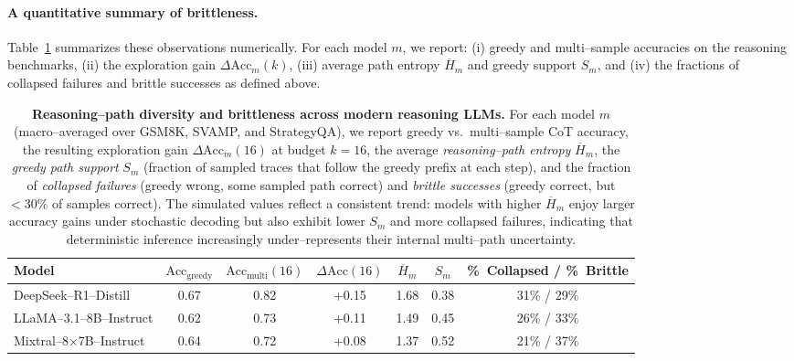 \paragraph{A quantitative summary of brittleness.}
Table~\ref{tab:reasoning-brittleness} summarizes these observations
numerically.
For each model $m$, we report:
(i) greedy and multi--sample accuracies on the reasoning benchmarks,
(ii) the exploration gain $\Delta \mathrm{Acc}_m(k)$,
(iii) average path entropy $\overline{H}_m$ and greedy support $S_m$,
and (iv) the fractions of collapsed failures and brittle successes as
defined above.

\begin{table}[ht!]
  \centering
  \small
  \caption{
    \textbf{Reasoning--path diversity and brittleness across modern reasoning LLMs.}
    For each model $m$ (macro--averaged over GSM8K, SVAMP, and StrategyQA), we report
    greedy vs.\ multi--sample CoT accuracy, the resulting exploration gain
    $\Delta \mathrm{Acc}_m(16)$ at budget $k{=}16$, the average
    \emph{reasoning--path entropy} $\overline{H}_m$, the
    \emph{greedy path support} $S_m$ (fraction of sampled traces that follow the
    greedy prefix at each step), and the fraction of
    \emph{collapsed failures} (greedy wrong, some sampled path correct) and
    \emph{brittle successes} (greedy correct, but $<30\%$ of samples correct).
    The simulated values reflect a consistent trend:
    models with higher $\overline{H}_m$ enjoy larger accuracy gains under
    stochastic decoding but also exhibit lower $S_m$ and more collapsed failures,
    indicating that deterministic inference increasingly under--represents their
    internal multi--path uncertainty.
  }
  \label{tab:reasoning-brittleness}
  \begin{tabular}{lcccccc}
    \toprule
    \textbf{Model} &
    $\mathrm{Acc}_{\mathrm{greedy}}$ &
    $\mathrm{Acc}_{\mathrm{multi}}(16)$ &
    $\Delta \mathrm{Acc}(16)$ &
    $\overline{H}_m$ &
    $S_m$ &
    \%~Collapsed / \%~Brittle \\
    \midrule
    DeepSeek--R1--Distill &
      0.67 & 0.82 & +0.15 & 1.68 & 0.38 & 31\% / 29\% \\
    LLaMA--3.1--8B--Instruct &
      0.62 & 0.73 & +0.11 & 1.49 & 0.45 & 26\% / 33\% \\
    Mixtral--8$\times$7B--Instruct &
      0.64 & 0.72 & +0.08 & 1.37 & 0.52 & 21\% / 37\% \\
    \bottomrule
  \end{tabular}
\end{table}

